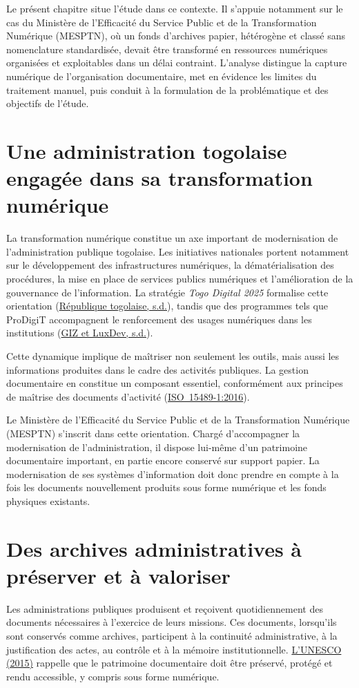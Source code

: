 \documentclass[12pt,a4paper]{report}
\newcommand{\citer}[2]{\hyperref[ref:#1]{#2}}
\newcommand{\nomMinistere}{Ministère de l'Efficacité du Service Public et de la Transformation Numérique (MESPTN)}
\begin{document}
Le présent chapitre situe l'étude dans ce contexte. Il s'appuie notamment sur le cas du \nomMinistere{}, où un fonds d'archives papier, hétérogène et classé sans nomenclature standardisée, devait être transformé en ressources numériques organisées et exploitables dans un délai contraint. L'analyse distingue la capture numérique de l'organisation documentaire, met en évidence les limites du traitement manuel, puis conduit à la formulation de la problématique et des objectifs de l'étude.

\section{Une administration togolaise engagée dans sa transformation numérique}
La transformation numérique constitue un axe important de modernisation de l'administration publique togolaise. Les initiatives nationales portent notamment sur le développement des infrastructures numériques, la dématérialisation des procédures, la mise en place de services publics numériques et l'amélioration de la gouvernance de l'information. La stratégie \textit{Togo Digital 2025} formalise cette orientation (\citer{togodigital2025}{République togolaise, s.d.}), tandis que des programmes tels que ProDigiT accompagnent le renforcement des usages numériques dans les institutions (\citer{prodigit}{GIZ et LuxDev, s.d.}).

Cette dynamique implique de maîtriser non seulement les outils, mais aussi les informations produites dans le cadre des activités publiques. La gestion documentaire en constitue un composant essentiel, conformément aux principes de maîtrise des documents d'activité (\citer{iso15489}{\mbox{ISO 15489-1:2016}}).

Le \nomMinistere{} s'inscrit dans cette orientation. Chargé d'accompagner la modernisation de l'administration, il dispose lui-même d'un patrimoine documentaire important, en partie encore conservé sur support papier. La modernisation de ses systèmes d'information doit donc prendre en compte à la fois les documents nouvellement produits sous forme numérique et les fonds physiques existants.

\section{Des archives administratives à préserver et à valoriser}
Les administrations publiques produisent et reçoivent quotidiennement des documents nécessaires à l'exercice de leurs missions. Ces documents, lorsqu'ils sont conservés comme archives, participent à la continuité administrative, à la justification des actes, au contrôle et à la mémoire institutionnelle. \citer{unesco2015}{L'UNESCO (2015)} rappelle que le patrimoine documentaire doit être préservé, protégé et rendu accessible, y compris sous forme numérique.
\end{document}

